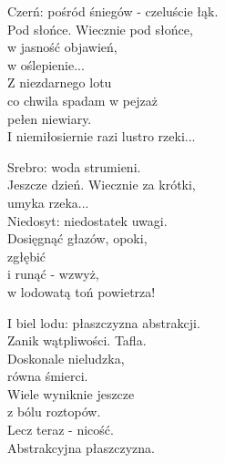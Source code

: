 \begin{text}
Czerń: pośród śniegów - czeluście łąk.\\
Pod słońce. Wiecznie pod słońce,\\
w jasność objawień,\\
w oślepienie...\\
Z niezdarnego lotu\\
co chwila spadam w pejzaż\\
pełen niewiary.\\
I niemiłosiernie razi lustro rzeki...

Srebro: woda strumieni.\\
Jeszcze dzień. Wiecznie za krótki,\\
umyka rzeka...\\
Niedosyt: niedostatek uwagi.\\
Dosięgnąć głazów, opoki,\\
zgłębić\\
i runąć - wzwyż,\\
w lodowatą toń powietrza!

I biel lodu: płaszczyzna abstrakcji.\\
Zanik wątpliwości. Tafla.\\
Doskonale nieludzka,\\
równa śmierci.\\
Wiele wyniknie jeszcze\\
z bólu roztopów.\\
Lecz teraz - nicość.\\
Abstrakcyjna płaszczyzna.
\end{text}
\begin{chord}
\end{chord}